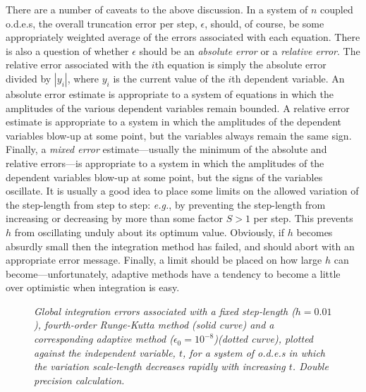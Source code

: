 There are a number of caveats to the above discussion. In a system of $n$ coupled
o.d.e.s, the overall truncation error per step, $\epsilon$,  should, of course, be some appropriately
weighted average of the errors associated with each equation. There is also a question
of whether $\epsilon$ should be an {\em absolute error}\/ or a {\em relative error}. The
relative error associated with the $i$th equation is simply the absolute error
divided by $|y_i|$, where $y_i$ is the current value of the $i$th dependent variable.
An absolute error estimate is appropriate to a system of equations in which the amplitudes
of the various dependent variables remain bounded. A relative error estimate
is appropriate to a system in which the amplitudes of the dependent variables blow-up at some point, but 
the variables always
remain the same sign. Finally, a {\em mixed error}\/ estimate---usually the minimum of the
absolute and relative errors---is appropriate to a system in which the amplitudes of the dependent variables blow-up at some point, but 
the signs of the variables oscillate. It is usually a good idea to place some
limits on the allowed variation of the step-length from step to step: {\em e.g.}, by preventing
the step-length from increasing or decreasing by more than some factor $S>1$ per step. This
prevents $h$ from oscillating unduly about its optimum value. Obviously, if $h$ becomes
absurdly small then the integration method has failed, and should abort with an
appropriate error message. Finally, a limit should be placed on how
large $h$ can become---unfortunately, adaptive methods have a tendency to become a little
over optimistic when integration is easy.   

\begin{figure}
\epsfysize=3in
\centerline{}
\caption{\em Global integration errors associated with a
fixed step-length ($h=0.01$), fourth-order Runge-Kutta method (solid curve) and
a corresponding adaptive method ($\epsilon_0=10^{-8}$)(dotted curve),  plotted
against the independent variable, $t$, for a system of o.d.e.s
in which the variation scale-length decreases rapidly with
increasing $t$.  Double precision calculation.}\label{f5x}
\end{figure}

